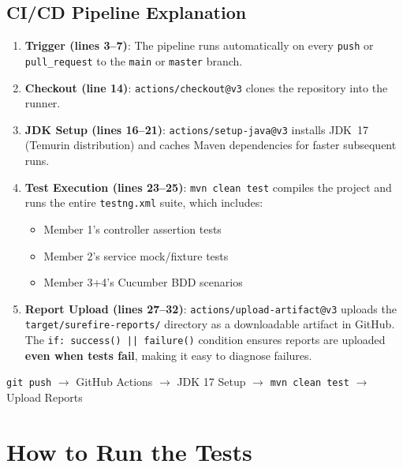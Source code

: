 \documentclass[12pt,a4paper]{article}
\begin{document}
\subsection{CI/CD Pipeline Explanation}

\begin{enumerate}
    \item \textbf{Trigger (lines 3--7)}: The pipeline runs automatically on every \texttt{push} or \texttt{pull\_request} to the \texttt{main} or \texttt{master} branch.
    
    \item \textbf{Checkout (line 14)}: \texttt{actions/checkout@v3} clones the repository into the runner.
    
    \item \textbf{JDK Setup (lines 16--21)}: \texttt{actions/setup-java@v3} installs JDK~17 (Temurin distribution) and caches Maven dependencies for faster subsequent runs.
    
    \item \textbf{Test Execution (lines 23--25)}: \texttt{mvn clean test} compiles the project and runs the entire \texttt{testng.xml} suite, which includes:
    \begin{itemize}[nosep]
        \item Member 1's controller assertion tests
        \item Member 2's service mock/fixture tests
        \item Member 3+4's Cucumber BDD scenarios
    \end{itemize}
    
    \item \textbf{Report Upload (lines 27--32)}: \texttt{actions/upload-artifact@v3} uploads the \texttt{target/surefire-reports/} directory as a downloadable artifact in GitHub. The \texttt{if: success() || failure()} condition ensures reports are uploaded \textbf{even when tests fail}, making it easy to diagnose failures.
\end{enumerate}

\begin{tcolorbox}[noteboxstyle, title=CI/CD Workflow Summary]
\centering
\texttt{git push} $\rightarrow$ GitHub Actions $\rightarrow$ JDK 17 Setup $\rightarrow$ \texttt{mvn clean test} $\rightarrow$ Upload Reports
\end{tcolorbox}

\section{How to Run the Tests}
\end{document}
